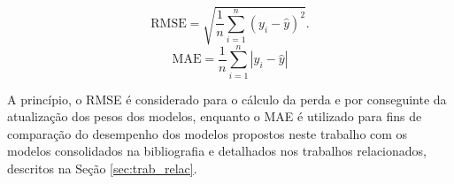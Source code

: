 \begin{equation}\label{eq:rmse}
     \textrm{RMSE} = \sqrt{\frac{1}{n} \sum_{i=1}^n (y_i - \hat{y})^2}.
\end{equation}
\begin{equation}\label{eq:mae}
     \textrm{MAE} = \frac{1}{n}\sum_{i=1}^{n} |y_i - \hat{y}|
\end{equation}

A princípio, o RMSE é considerado para o cálculo da perda e por conseguinte da atualização dos pesos dos modelos, enquanto o MAE é utilizado para fins de comparação do desempenho dos modelos propostos neste trabalho com os modelos consolidados na bibliografia e detalhados nos trabalhos relacionados, descritos na Seção \ref{sec:trab_relac}.
